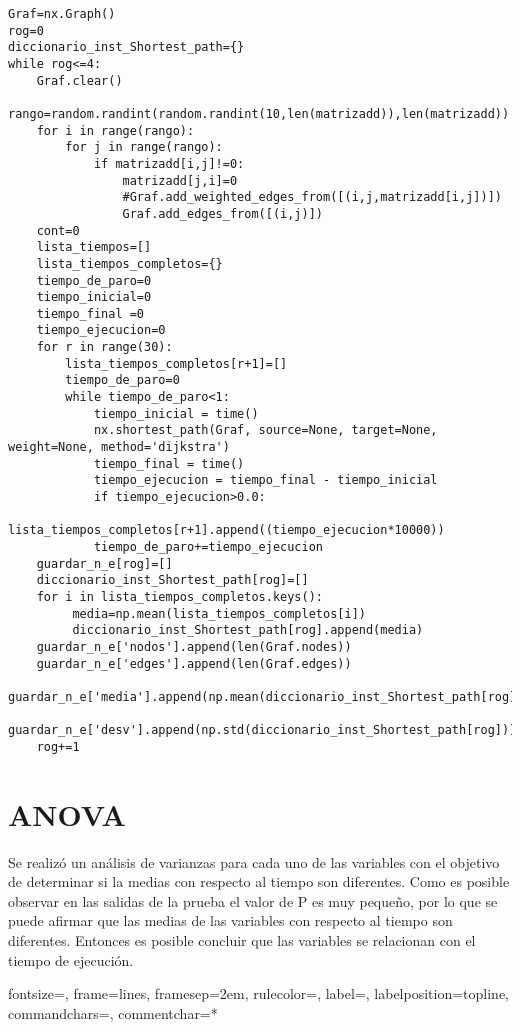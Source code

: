 \documentclass[a4paper, 11pt]{article}
\begin{document}
\begin{lstlisting}[frame=single]
Graf=nx.Graph()
rog=0
diccionario_inst_Shortest_path={}
while rog<=4:
    Graf.clear()
    rango=random.randint(random.randint(10,len(matrizadd)),len(matrizadd))
    for i in range(rango):
        for j in range(rango):
            if matrizadd[i,j]!=0:
                matrizadd[j,i]=0
                #Graf.add_weighted_edges_from([(i,j,matrizadd[i,j])])
                Graf.add_edges_from([(i,j)])
    cont=0
    lista_tiempos=[] 
    lista_tiempos_completos={}    
    tiempo_de_paro=0
    tiempo_inicial=0
    tiempo_final =0 
    tiempo_ejecucion=0    
    for r in range(30):
        lista_tiempos_completos[r+1]=[]
        tiempo_de_paro=0    
        while tiempo_de_paro<1:            
            tiempo_inicial = time()             
            nx.shortest_path(Graf, source=None, target=None, weight=None, method='dijkstra')           
            tiempo_final = time()  
            tiempo_ejecucion = tiempo_final - tiempo_inicial        
            if tiempo_ejecucion>0.0:
                lista_tiempos_completos[r+1].append((tiempo_ejecucion*10000))  
            tiempo_de_paro+=tiempo_ejecucion  
    guardar_n_e[rog]=[]
    diccionario_inst_Shortest_path[rog]=[]
    for i in lista_tiempos_completos.keys():
         media=np.mean(lista_tiempos_completos[i])
         diccionario_inst_Shortest_path[rog].append(media)
    guardar_n_e['nodos'].append(len(Graf.nodes))
    guardar_n_e['edges'].append(len(Graf.edges))  
    guardar_n_e['media'].append(np.mean(diccionario_inst_Shortest_path[rog]))
    guardar_n_e['desv'].append(np.std(diccionario_inst_Shortest_path[rog]))
    rog+=1 
\end{lstlisting}

\section{ANOVA}
Se realiz\'o un an\'alisis de varianzas para cada uno de las variables con el objetivo de determinar si la medias con respecto al tiempo son diferentes. Como es posible observar en las salidas de la prueba el valor de P es muy pequeño, por lo que se puede afirmar que las medias de las variables con respecto al tiempo son diferentes. Entonces es posible concluir que las variables se relacionan con el tiempo de ejecuci\'on.
\newpage

%
{fontsize=\footnotesize,
 frame=lines,  %
 framesep=2em, %
 rulecolor=\color{Gray},
 label=,
 labelposition=topline,
 commandchars=\|\(\), %
 commentchar=*        %
}
\end{document}
